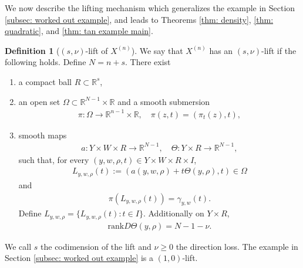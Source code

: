 \documentclass[reqno,11pt]{amsart}
\numberwithin{equation}{section}
\numberwithin{figure}{section}
\def\R{\mathbb{R}}
\renewcommand\geq{\geqslant}
\theoremstyle{plain}
\theoremstyle{definition}
\newtheorem{definition}[thm]{Definition}
\newcommand{\rank}{\mathrm{rank}}
\begin{document}
    We now describe the lifting mechanism which generalizes the example in Section \ref{subsec: worked out example}, and leads to Theorems \ref{thm: density}, \ref{thm: quadratic}, and \ref{thm: tan example main}.

    
    \begin{definition}[$(s,\nu)$-lift of $X^{(n)}$]
        We say that $X^{(n)}$ has an $(s,\nu)$-lift if the following holds. Define $N = n+s$. There exist
        \begin{enumerate}[label=(\roman*)]
            \item a compact ball $R \subset \R^s$,
            \item an open set $\Omega \subset \R^{N-1} \times \R$ and a smooth submersion 
            \begin{align}
                \pi : \Omega \to \R^{n-1} \times \R, \quad \pi(z,t) = (\pi_t(z), t),
            \end{align}
            \item smooth maps
            \begin{align}
                a : Y \times W \times R \to \R^{N-1}, \quad \Theta : Y \times R \to \R^{N-1},
            \end{align}
            such that, for every $(y,w,\rho,t) \in Y \times W \times R \times I$,
            \begin{align}
                L_{y,w,\rho}(t):=(a(y,w,\rho) + t\Theta(y,\rho), t) \in \Omega
            \end{align}
            and 
            \begin{align}\label{eq: projection property}
                \pi(L_{y,w,\rho}(t)) = \gamma_{y,w}(t).
            \end{align}
            Define $L_{y,w,\rho} = \{L_{y,w,\rho}(t) : t \in I\}$.
            Additionally on $Y \times R$,  
            \begin{align}\label{eq: direction rank}
                \rank D\Theta(y,\rho)= N-1-\nu.
            \end{align}
        \end{enumerate}
    \end{definition}
    We call $s$ the codimension of the lift and $\nu \geq 0$ the direction loss. The example in Section \ref{subsec: worked out example} is a $(1,0)$-lift. 
\end{document}
